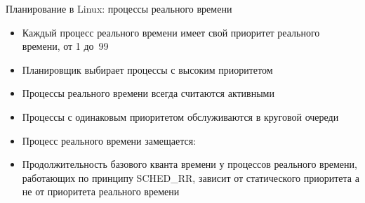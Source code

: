 \documentclass[aspectratio=169,14pt]{beamer}
\begin{document}
\begin{frame}{Планирование в Linux: процессы реального времени}
    \begin{footnotesize}
    \begin{itemize}
        \item Каждый процесс реального времени имеет свой приоритет реального
        времени, от 1 до~99
        \item Планировщик выбирает процессы с высоким приоритетом
        \item Процессы реального времени всегда считаются активными
        \item Процессы с одинаковым приоритетом обслуживаются в круговой очереди
        \item Процесс реального времени замещается:
        \begin{itemize}
        \end{itemize}
        \item Продолжительность базового кванта времени у процессов реального
        времени, работающих по принципу SCHED\_RR, зависит от статического
        приоритета а не от приоритета реального времени
    \end{itemize}
    \end{footnotesize}
\end{frame}
\end{document}
